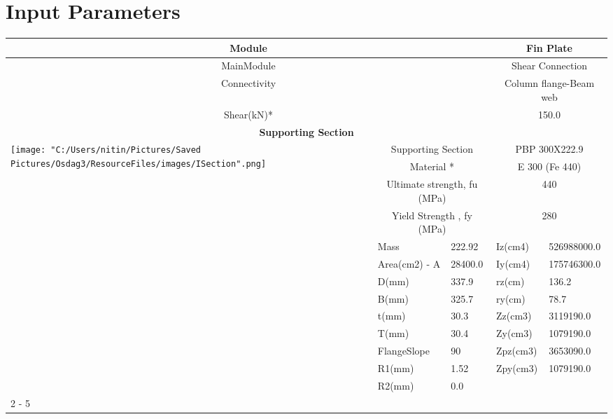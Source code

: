 \documentclass{article}%
\begin{document}
%
\normalsize%
\pagestyle{header}%
\section{Input Parameters}%
\label{sec:InputParameters}%
\renewcommand{\arraystretch}{1.2}%
\begin{longtable}{|p{5cm}|p{2cm}|p{2cm}|p{2cm}|p{5cm}|}%
\hline%
\hline%
\multicolumn{3}{|c|}{Module}&\multicolumn{2}{|c|}{Fin Plate}\\%
\hline%
\hline%
\multicolumn{3}{|c|}{MainModule}&\multicolumn{2}{|c|}{Shear Connection}\\%
\hline%
\hline%
\multicolumn{3}{|c|}{Connectivity}&\multicolumn{2}{|c|}{Column flange{-}Beam web}\\%
\hline%
\hline%
\multicolumn{3}{|c|}{Shear(kN)*}&\multicolumn{2}{|c|}{150.0}\\%
\hline%
\hline%
\multicolumn{5}{|c|}{\textbf{Supporting Section}}\\%
\hline%
\hline%
\multirow{13}{*}{\texttt{[image: "C:/Users/nitin/Pictures/Saved Pictures/Osdag3/ResourceFiles/images/ISection".png]}}&\multicolumn{2}{|c|}{Supporting Section}&\multicolumn{2}{|c|}{PBP 300X222.9}\\%
\cline{2%
-%
5}%
&\multicolumn{2}{|c|}{Material *}&\multicolumn{2}{|c|}{E 300 (Fe 440)}\\%
\cline{2%
-%
5}%
&\multicolumn{2}{|c|}{Ultimate strength, fu (MPa)}&\multicolumn{2}{|c|}{440}\\%
\cline{2%
-%
5}%
&\multicolumn{2}{|c|}{Yield Strength , fy (MPa)}&\multicolumn{2}{|c|}{280}\\%
\cline{2%
-%
5}%
&Mass&222.92&Iz(cm4)&526988000.0\\%
\cline{2%
-%
5}%
&Area(cm2) {-} A&28400.0&Iy(cm4)&175746300.0\\%
\cline{2%
-%
5}%
&D(mm)&337.9&rz(cm)&136.2\\%
\cline{2%
-%
5}%
&B(mm)&325.7&ry(cm)&78.7\\%
\cline{2%
-%
5}%
&t(mm)&30.3&Zz(cm3)&3119190.0\\%
\cline{2%
-%
5}%
&T(mm)&30.4&Zy(cm3)&1079190.0\\%
\cline{2%
-%
5}%
&FlangeSlope&90&Zpz(cm3)&3653090.0\\%
\cline{2%
-%
5}%
&R1(mm)&1.52&Zpy(cm3)&1079190.0\\%
\cline{2%
-%
5}%
&R2(mm)&0.0&&\\%
\cline{2%
-%
5}%
\hline%
\multicolumn{5}{|c|}{\textbf{Supported Section}}\\%

\end{longtable}
\end{document}
